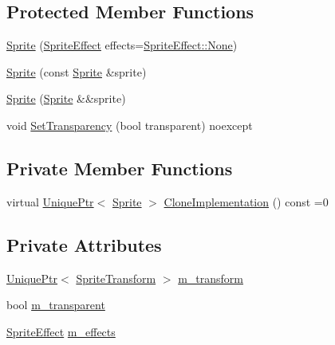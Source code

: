 \subsection*{Protected Member Functions}
\begin{DoxyCompactItemize}
\item 
\hyperlink{classmage_1_1_sprite_a4e7926b7fd1455afcb95e45f25b83246}{Sprite} (\hyperlink{namespacemage_a9cfe18123066ba4236f548f9de75d881}{Sprite\+Effect} effects=\hyperlink{namespacemage_a5e7e18b0154373ce8fc942fe3f6b27fda6adf97f83acf6453d4a6a4b1070f3754}{Sprite\+Effect\+::\+None})
\item 
\hyperlink{classmage_1_1_sprite_a9c1eb4f5a85e1fa17479012dd22114a9}{Sprite} (const \hyperlink{classmage_1_1_sprite}{Sprite} \&sprite)
\item 
\hyperlink{classmage_1_1_sprite_a84d01e440d0a8105d45a3e18a0698d07}{Sprite} (\hyperlink{classmage_1_1_sprite}{Sprite} \&\&sprite)
\item 
void \hyperlink{classmage_1_1_sprite_a7e227faa0f2b058d4cbcbb252a49e728}{Set\+Transparency} (bool transparent) noexcept
\end{DoxyCompactItemize}
\subsection*{Private Member Functions}
\begin{DoxyCompactItemize}
\item 
virtual \hyperlink{namespacemage_a3316d7143a973e37adf1110f2e80ca31}{Unique\+Ptr}$<$ \hyperlink{classmage_1_1_sprite}{Sprite} $>$ \hyperlink{classmage_1_1_sprite_a214890d7da493bccadb2327b8c7ffb09}{Clone\+Implementation} () const =0
\end{DoxyCompactItemize}
\subsection*{Private Attributes}
\begin{DoxyCompactItemize}
\item 
\hyperlink{namespacemage_a3316d7143a973e37adf1110f2e80ca31}{Unique\+Ptr}$<$ \hyperlink{structmage_1_1_sprite_transform}{Sprite\+Transform} $>$ \hyperlink{classmage_1_1_sprite_ae9907dd9d43fe2ce025bbc86b06dc7a3}{m\+\_\+transform}
\item 
bool \hyperlink{classmage_1_1_sprite_a893427eff3913e5d37e75f4ee176ec46}{m\+\_\+transparent}
\item 
\hyperlink{namespacemage_a9cfe18123066ba4236f548f9de75d881}{Sprite\+Effect} \hyperlink{classmage_1_1_sprite_a87a51b2b131c28bad75768d14defa3c1}{m\+\_\+effects}
\end{DoxyCompactItemize}


